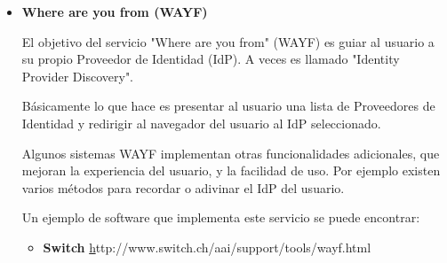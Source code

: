 \begin{itemize}
    Un SP está estrechamente relacionado con un servidor web, y se
    comunica con los diferentes IdPs de la federación. Esta es la
    forma que tiene el sistema de pasar los datos de identidad de una
    organización a otra, de forma segura, a través del protocolo SAML.

    Cada aplicación web federada debería estar protegida por un SP,
    así pues puede haber más de un SP por cada organización.

    Dada la estrecha relación entre el IdP y el SP, el software
    necesario para dar este servicio se puede encontrar en las mismas
    páginas. Tanto Shibboleth, como simplesamlphp ofrecen tanto el
    servicio de IdP, como el de SP:

    \begin{itemize}
        \item \textbf{Shibboleth IdP} \href{http://shibboleth.internet2.edu/}http://shibboleth.internet2.edu/
        \item \textbf{SimpleSAMLPHP} \href{http://code.google.com/p/simplesamlphp/}http://code.google.com/p/simplesamlphp/
    \end{itemize}

    En teoría es independiente el software que se utilice como IdP, o
    como SP por las diferentes organizaciones, ya que todos deberían
    compartir el mismo protocolo, SAML.

            \item \textbf{Where are you from (WAYF)}

    El objetivo del servicio "Where are you from" (WAYF) es guiar al
    usuario a su propio Proveedor de Identidad (IdP). A veces es
    llamado "Identity Provider Discovery".

    Básicamente lo que hace es presentar al usuario una lista de
    Proveedores de Identidad y redirigir al navegador del usuario al
    IdP seleccionado.

    Algunos sistemas WAYF implementan otras funcionalidades
    adicionales, que mejoran la experiencia del usuario, y la
    facilidad de uso. Por ejemplo existen varios métodos para recordar
    o adivinar el IdP del usuario.

    Un ejemplo de software que implementa este servicio se puede
    encontrar:
    
    \begin{itemize}
        \item \textbf{Switch} \href{http://www.switch.ch/aai/support/tools/wayf.html}http://www.switch.ch/aai/support/tools/wayf.html
    \end{itemize}


\end{itemize}
